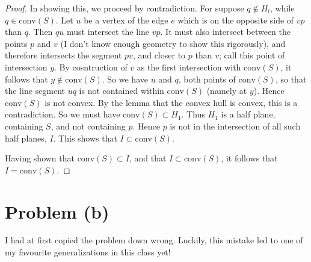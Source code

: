 \documentclass[12pt]{article}
\newcommand{\conv}[1]{\mbox{conv}(#1)}
\theoremstyle{definition}
\begin{document}
\begin{proof}
In showing this, we proceed by contradiction. For suppose $q\not\in H_l$, while $q\in \conv{S}$. Let $u$ be a vertex of the edge $e$ which is on the opposite side of $vp$ than $q$. Then $qu$ must intersect the line $vp$. It must also intersect between the points $p$ and $v$ (I don't know enough geometry to show this rigorously), and therefore intersects the segment $pv$, and closer to $p$ than $v$; call this point of intersection $y$. By cosntruction of $v$ as the first intersection with $\conv{S}$, it follows that $y\not\in \conv{S}$. So we have $u$ and $q$, both points of $\conv{S}$, so that the line segment $uq $ is not contained within $\conv{S}$ (namely at $y$). Hence $\conv{S}$ is not convex. By the lemma that the convex hull is convex, this is a contradiction. So we must have $\conv{S} \subset H_1$. Thus $H_1$ is a half plane, containing $S$, and not containing $p$. Hence $p$ is not in the intersection of all such half planes, $I$. This shows that $I\subset \conv{S}$.

Having shown that $\conv{S}\subset I$, and that $I\subset \conv{S}$, it follows that $I= \conv{S}$.
\end{proof}

\newpage



\section{Problem (b)}

I had at first copied the problem down wrong. Luckily, this mistake led to one of my favourite generalizations in this class yet!
\end{document}
